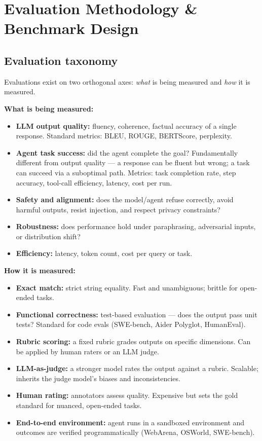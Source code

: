 
\section{Evaluation Methodology \& Benchmark Design}

\subsection{Evaluation taxonomy}

Evaluations exist on two orthogonal axes: \emph{what} is being measured and \emph{how}
it is measured.

\textbf{What is being measured:}
\begin{itemize}
  \item \textbf{LLM output quality:} fluency, coherence, factual accuracy of a single
    response. Standard metrics: BLEU, ROUGE, BERTScore, perplexity.
  \item \textbf{Agent task success:} did the agent complete the goal? Fundamentally
    different from output quality --- a response can be fluent but wrong; a task can
    succeed via a suboptimal path. Metrics: task completion rate, step accuracy,
    tool-call efficiency, latency, cost per run.
  \item \textbf{Safety and alignment:} does the model/agent refuse correctly, avoid
    harmful outputs, resist injection, and respect privacy constraints?
  \item \textbf{Robustness:} does performance hold under paraphrasing, adversarial
    inputs, or distribution shift?
  \item \textbf{Efficiency:} latency, token count, cost per query or task.
\end{itemize}

\textbf{How it is measured:}
\begin{itemize}
  \item \textbf{Exact match:} strict string equality. Fast and unambiguous; brittle for
    open-ended tasks.
  \item \textbf{Functional correctness:} test-based evaluation --- does the output
    pass unit tests? Standard for code evals (SWE-bench, Aider Polyglot, HumanEval).
  \item \textbf{Rubric scoring:} a fixed rubric grades outputs on specific dimensions.
    Can be applied by human raters or an LLM judge.
  \item \textbf{LLM-as-judge:} a stronger model rates the output against a rubric.
    Scalable; inherits the judge model's biases and inconsistencies.
  \item \textbf{Human rating:} annotators assess quality. Expensive but sets the gold
    standard for nuanced, open-ended tasks.
  \item \textbf{End-to-end environment:} agent runs in a sandboxed environment and
    outcomes are verified programmatically (WebArena, OSWorld, SWE-bench).
\end{itemize}

